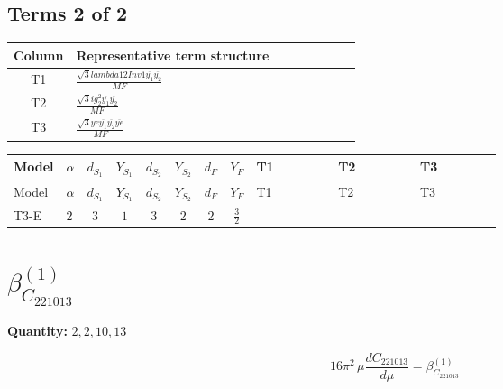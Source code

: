 \documentclass[8pt]{article}
\begin{document}
\begin{landscape}
\subsection*{Terms 2 of 2}
\begin{center}
\begin{tabular}{@{}c >{\raggedright\arraybackslash}p{0.82\linewidth}@{}}
\toprule
Column & Representative term structure \\
\midrule
T1 & \(\displaystyle \frac{\sqrt{3} lambda12Inv1 \overline{y_{1}} \overline{y_{2}}}{MF}\) \\
\midrule
T2 & \(\displaystyle \frac{\sqrt{3} i g_{2}^{2} \overline{y_{1}} \overline{y_{2}}}{MF}\) \\
\midrule
T3 & \(\displaystyle \frac{\sqrt{3} ye \overline{y_{1}} \overline{y_{2}} \overline{ye}}{MF}\) \\
\midrule
\bottomrule
\end{tabular}
\end{center}
\smallskip
\tiny
\begin{longtable}{@{}llcccccc >{\raggedright\arraybackslash}p{0.21\linewidth} >{\raggedright\arraybackslash}p{0.21\linewidth} >{\raggedright\arraybackslash}p{0.21\linewidth}@{}}
\toprule
Model & $\alpha$ & $d_{S_1}$ & $Y_{S_1}$ & $d_{S_2}$ & $Y_{S_2}$ & $d_F$ & $Y_F$ & T1 & T2 & T3 \\
\midrule
\endfirsthead
\toprule
Model & $\alpha$ & $d_{S_1}$ & $Y_{S_1}$ & $d_{S_2}$ & $Y_{S_2}$ & $d_F$ & $Y_F$ & T1 & T2 & T3 \\
\midrule
\endhead
T3-E & $2$ & $3$ & $1$ & $3$ & $2$ & $2$ & $\frac{3}{2}$ & \scriptsize\adjustbox{max width=\linewidth}{$\begin{gathered} \frac{\sqrt{3} lambda12Inv1 \overline{y_{1}} \overline{y_{2}}}{6 MF}\end{gathered}$} & \scriptsize\adjustbox{max width=\linewidth}{$\begin{gathered} - \frac{\sqrt{3} i g_{2}^{2} \overline{y_{1}} \overline{y_{2}}}{6 MF}\end{gathered}$} & \scriptsize\adjustbox{max width=\linewidth}{$\begin{gathered} \frac{\sqrt{3} ye \overline{y_{1}} \overline{y_{2}} \overline{ye}}{12 MF}\end{gathered}$} \\
\midrule
\bottomrule
\end{longtable}
\clearpage
\section*{$\beta_{C_{221013}}^{(1)}$}
\noindent\textbf{Quantity: }$\mathrm{2,2,10,13}$\par\smallskip
\[16\pi^2\,\mu\frac{d C_{221013}}{d\mu}=\beta_{C_{221013}}^{(1)}\]

\end{landscape}
\end{document}
